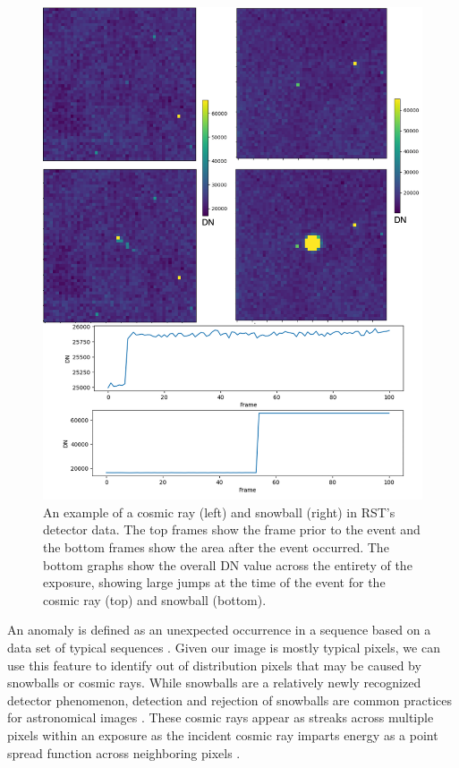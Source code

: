 \begin{figure}
    \centering
    \includegraphics[width=.75\linewidth]{figs/rst/Examples_fixed.png}
    \caption[An Example of a Cosmic Ray and a Snowball in WFI Detector Data]{An example of a cosmic ray (left) and snowball (right) in RST's detector data. The top frames show the frame prior to the event and the bottom frames show the area after the event occurred. The bottom graphs show the overall DN value across the entirety of the exposure, showing large jumps at the time of the event for the cosmic ray (top) and snowball (bottom).}
    \label{rst/fig:anomalies}
\end{figure}

An anomaly is defined as an unexpected occurrence in a sequence based on a data set of typical sequences \parencite{horton2021integrating}. 
Given our image is mostly typical pixels, we can use this feature to identify out of distribution pixels that may be caused by snowballs or cosmic rays. 
While snowballs are a relatively newly recognized detector phenomenon, detection and rejection of snowballs are common practices for astronomical images \parencite{van2001cosmic}.
These cosmic rays appear as streaks across multiple pixels within an exposure as the incident cosmic ray imparts energy as a point spread function across neighboring pixels \parencite{pych2003fast}.

